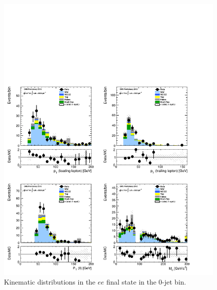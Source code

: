 \begin{figure}[!hbtp]
\centering
\includegraphics[width=1\textwidth]{figures/ww_analysis20_0_ALL_ee_0j.pdf}
\caption{Kinematic distributions in the $ee$ final state in the 0-jet bin.}
\label{fig:xs_kinematics_ee_0j}
\end{figure}
